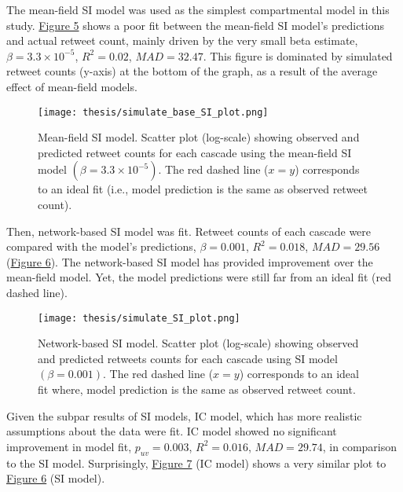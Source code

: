 \documentclass[11pt,a4paper]{article}
\begin{document}
    The mean-field SI model was used as the simplest compartmental model in this study. \hyperlink{fig:base-SI}{Figure 5} shows a poor fit between the mean-field SI model's predictions and actual retweet count, mainly driven by the very small beta estimate, $\beta = 3.3 \times 10^{-5}$, $R^2 = 0.02$, $MAD = 32.47$. This figure is dominated by simulated retweet counts (y-axis) at the bottom of the graph, as a result of the average effect of mean-field models.    

    \begin{figure}[H]
        \hypertarget{fig:base-SI}{}
        \centering
        \texttt{[image: thesis/simulate\_base\_SI\_plot.png]}\\
        \caption{Mean-field SI model. Scatter plot (log-scale) showing observed and predicted retweet counts for each cascade using the mean-field SI model $(\beta = 3.3 \times 10^{-5})$. The red dashed line ($x=y$) corresponds to an ideal fit (i.e., model prediction is the same as observed retweet count).}
        \label{fig:enter-label}
    \end{figure}
    
    Then, network-based SI model was fit. Retweet counts of each cascade were compared with the model's predictions, $\beta = 0.001$, $R^2 = 0.018$, $MAD = 29.56$ (\hyperlink{fig:SI}{Figure 6}). The network-based SI model has provided improvement over the mean-field model. Yet, the model predictions were still far from an ideal fit (red dashed line).
    
    \begin{figure}[H]
        \hypertarget{fig:SI}{}
        \centering
        \texttt{[image: thesis/simulate\_SI\_plot.png]}\\
        \caption{Network-based SI model. Scatter plot (log-scale) showing observed and predicted retweets counts for each cascade using SI model $(\beta = 0.001)$. The red dashed line ($x=y$) corresponds to an ideal fit where, model prediction is the same as observed retweet count.}    
        \label{fig:enter-label}
    \end{figure}
    
    Given the subpar results of SI models, IC model, which has more realistic assumptions about the data were fit. IC model showed no significant improvement in model fit, $p_{uv} = 0.003$, $R^2 = 0.016$, $MAD = 29.74$, in comparison to the SI model. Surprisingly, \hyperlink{fig:IC}{Figure 7} (IC model) shows a very similar plot to \hyperlink{fig:SI}{Figure 6} (SI model).
    
\end{document}
